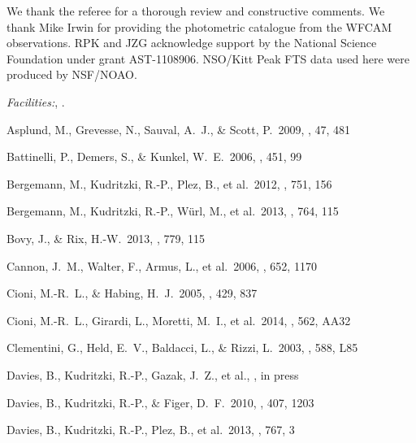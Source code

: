 \documentclass[iop]{emulateapj}
\begin{document}




\acknowledgments

We thank the referee for a thorough review and constructive comments.
We thank Mike Irwin for providing the photometric catalogue from the WFCAM observations.
RPK and JZG acknowledge support by the National Science Foundation under grant AST-1108906.
NSO/Kitt Peak FTS data used here were produced by NSF/NOAO.

{\it Facilities:},
.

\begin{thebibliography}{}
 Asplund, M., Grevesse, N., Sauval, A.~J., \& Scott, P.\ 2009, \araa, 47, 481

 Battinelli, P., Demers, S., \& Kunkel, W.~E.\ 2006, \aap, 451, 99

 Bergemann, M.,
Kudritzki, R.-P., Plez, B., et al.\ 2012, \apj, 751, 156

 Bergemann, M.,
Kudritzki, R.-P., W{\"u}rl, M., et al.\ 2013, \apj, 764, 115

 Bovy, J., \& Rix, H.-W.\ 2013, \apj, 779, 115

 Cannon, J.~M., Walter,
F., Armus, L., et al.\ 2006, \apj, 652, 1170

 Cioni, M.-R.~L., \& Habing, H.~J.\ 2005, \aap, 429, 837

 Cioni, M.-R.~L., Girardi, L., Moretti, M.~I., et al.\ 2014, \aap, 562, AA32

 Clementini, G.,
Held, E.~V., Baldacci, L., \& Rizzi, L.\ 2003, \apjl, 588, L85

 Davies, B., Kudritzki,
R.-P., Gazak, J.~Z.,
et al., \apj, in press

 Davies, B., Kudritzki,
R.-P., \& Figer, D.~F.\ 2010, \mnras, 407, 1203

 Davies, B., Kudritzki,
R.-P., Plez, B., et al.\ 2013, \apj, 767, 3


\end{thebibliography}
\end{document}
